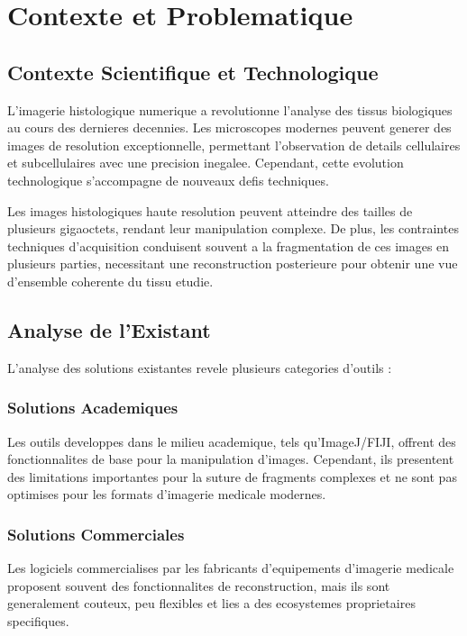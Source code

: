 \documentclass[12pt,a4paper]{article}
\begin{document}
\section{Contexte et Problematique}

\subsection{Contexte Scientifique et Technologique}

L'imagerie histologique numerique a revolutionne l'analyse des tissus biologiques au cours des dernieres decennies. Les microscopes modernes peuvent generer des images de resolution exceptionnelle, permettant l'observation de details cellulaires et subcellulaires avec une precision inegalee. Cependant, cette evolution technologique s'accompagne de nouveaux defis techniques.

Les images histologiques haute resolution peuvent atteindre des tailles de plusieurs gigaoctets, rendant leur manipulation complexe. De plus, les contraintes techniques d'acquisition conduisent souvent a la fragmentation de ces images en plusieurs parties, necessitant une reconstruction posterieure pour obtenir une vue d'ensemble coherente du tissu etudie.

\subsection{Analyse de l'Existant}

L'analyse des solutions existantes revele plusieurs categories d'outils :

\subsubsection{Solutions Academiques}
Les outils developpes dans le milieu academique, tels qu'ImageJ/FIJI, offrent des fonctionnalites de base pour la manipulation d'images. Cependant, ils presentent des limitations importantes pour la suture de fragments complexes et ne sont pas optimises pour les formats d'imagerie medicale modernes.

\subsubsection{Solutions Commerciales}
Les logiciels commercialises par les fabricants d'equipements d'imagerie medicale proposent souvent des fonctionnalites de reconstruction, mais ils sont generalement couteux, peu flexibles et lies a des ecosystemes proprietaires specifiques.
\end{document}
